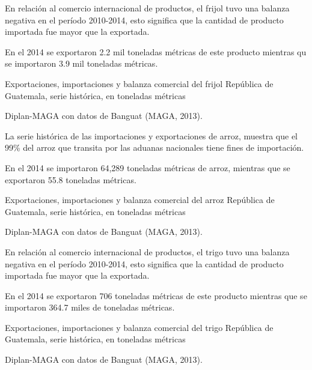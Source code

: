 %
{%
En relación al comercio internacional de productos, el frijol tuvo una balanza negativa en el período 2010-2014, esto significa que la cantidad de producto importada fue mayor que la exportada.

En el 2014 se exportaron 2.2 mil toneladas métricas de este producto mientras qu se importaron 3.9 mil toneladas métricas.}%
{%
	Exportaciones, importaciones y balanza comercial del frijol} %
{%
	República de Guatemala, serie histórica, en toneladas métricas } %
{%
	\begin{tikzpicture}[x=1pt,y=1pt]    \end{tikzpicture}}%
{%
	Diplan-MAGA con datos de Banguat (MAGA, 2013).} %



%
{%
	La serie histórica de las importaciones y exportaciones de arroz, muestra que el 99\% del arroz que transita por las aduanas nacionales tiene fines de importación.
	
	En el 2014 se importaron 64,289 toneladas métricas de arroz, mientras que se exportaron 55.8 toneladas métricas. 
}%
{%
	Exportaciones, importaciones y balanza comercial del arroz} %
{%
	República de Guatemala, serie histórica, en toneladas métricas } %
{%
	\begin{tikzpicture}[x=1pt,y=1pt]    \end{tikzpicture}}%
{%
		Diplan-MAGA con datos de Banguat (MAGA, 2013).} %


%
{%
	En relación al comercio internacional de productos, el trigo tuvo una balanza negativa en el período 2010-2014, esto significa que la cantidad de producto importada fue mayor que la exportada.
	
	En el 2014 se exportaron 706 toneladas métricas de este producto mientras que se importaron 364.7 miles de toneladas métricas.
}%
{%
	Exportaciones, importaciones y balanza comercial del trigo} %
{%
	República de Guatemala, serie histórica, en toneladas métricas } %
{%
	\begin{tikzpicture}[x=1pt,y=1pt]    \end{tikzpicture}}%
{%
	Diplan-MAGA con datos de Banguat (MAGA, 2013).} %


